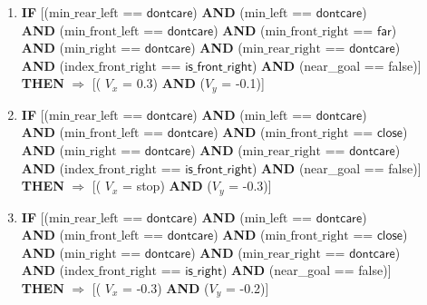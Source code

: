 \begin{enumerate}
	\item \textbf{IF} [($\text{min\_rear\_left}$ == $\textsf{dontcare}$) 
	\textbf{AND} ($\text{min\_left}$ == $\textsf{dontcare}$)\\
	\textbf{AND} ($\text{min\_front\_left}$ == $\textsf{dontcare}$)
	\textbf{AND} ($\text{min\_front\_right}$ == $\textsf{far}$)\\
	\textbf{AND} ($\text{min\_right}$ == $\textsf{dontcare}$) 
	\textbf{AND} ($\text{min\_rear\_right}$ == $\textsf{dontcare}$) \\
	\textbf{AND} ($\text{index\_front\_right}$ == $\textsf{is\_front\_right}$)
	\textbf{AND} (near\_goal == \textsf{false})]\\
	\textbf{THEN} $\Rightarrow$ [( $V_x$ = \textsf{0.3}) \textbf{AND} ($V_y$ = \textsf{-0.1})]	
	
	\item \textbf{IF} [($\text{min\_rear\_left}$ == $\textsf{dontcare}$) 
	\textbf{AND} ($\text{min\_left}$ == $\textsf{dontcare}$)\\
	\textbf{AND} ($\text{min\_front\_left}$ == $\textsf{dontcare}$)
	\textbf{AND} ($\text{min\_front\_right}$ == $\textsf{close}$)\\
	\textbf{AND} ($\text{min\_right}$ == $\textsf{dontcare}$) 
	\textbf{AND} ($\text{min\_rear\_right}$ == $\textsf{dontcare}$) \\
	\textbf{AND} ($\text{index\_front\_right}$ == $\textsf{is\_front\_right}$)
	\textbf{AND} (near\_goal == \textsf{false})]\\
	\textbf{THEN} $\Rightarrow$ [( $V_x$ = \textsf{stop}) \textbf{AND} ($V_y$ = \textsf{-0.3})]
	
	\item \textbf{IF} [($\text{min\_rear\_left}$ == $\textsf{dontcare}$) 
	\textbf{AND} ($\text{min\_left}$ == $\textsf{dontcare}$)\\
	\textbf{AND} ($\text{min\_front\_left}$ == $\textsf{dontcare}$)
	\textbf{AND} ($\text{min\_front\_right}$ == $\textsf{close}$)\\
	\textbf{AND} ($\text{min\_right}$ == $\textsf{dontcare}$) 
	\textbf{AND} ($\text{min\_rear\_right}$ == $\textsf{dontcare}$) \\
	\textbf{AND} ($\text{index\_front\_right}$ == $\textsf{is\_right}$)
	\textbf{AND} (near\_goal == \textsf{false})]\\
	\textbf{THEN} $\Rightarrow$ [( $V_x$ = \textsf{-0.3}) \textbf{AND} ($V_y$ = \textsf{-0.2})]
	

\end{enumerate}
